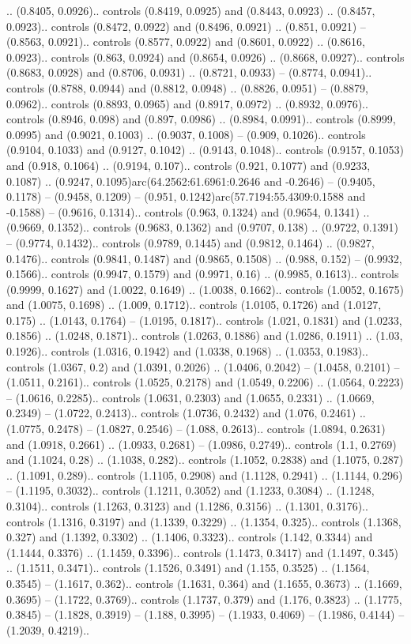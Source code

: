.. (0.8405, 0.0926).. controls (0.8419, 0.0925) and (0.8443, 0.0923) .. (0.8457, 0.0923).. controls (0.8472, 0.0922) and (0.8496, 0.0921) .. (0.851, 0.0921) -- (0.8563, 0.0921).. controls (0.8577, 0.0922) and (0.8601, 0.0922) .. (0.8616, 0.0923).. controls (0.863, 0.0924) and (0.8654, 0.0926) .. (0.8668, 0.0927).. controls (0.8683, 0.0928) and (0.8706, 0.0931) .. (0.8721, 0.0933) -- (0.8774, 0.0941).. controls (0.8788, 0.0944) and (0.8812, 0.0948) .. (0.8826, 0.0951) -- (0.8879, 0.0962).. controls (0.8893, 0.0965) and (0.8917, 0.0972) .. (0.8932, 0.0976).. controls (0.8946, 0.098) and (0.897, 0.0986) .. (0.8984, 0.0991).. controls (0.8999, 0.0995) and (0.9021, 0.1003) .. (0.9037, 0.1008) -- (0.909, 0.1026).. controls (0.9104, 0.1033) and (0.9127, 0.1042) .. (0.9143, 0.1048).. controls (0.9157, 0.1053) and (0.918, 0.1064) .. (0.9194, 0.107).. controls (0.921, 0.1077) and (0.9233, 0.1087) .. (0.9247, 0.1095)arc(64.2562:61.6961:0.2646 and -0.2646) -- (0.9405, 0.1178) -- (0.9458, 0.1209) -- (0.951, 0.1242)arc(57.7194:55.4309:0.1588 and -0.1588) -- (0.9616, 0.1314).. controls (0.963, 0.1324) and (0.9654, 0.1341) .. (0.9669, 0.1352).. controls (0.9683, 0.1362) and (0.9707, 0.138) .. (0.9722, 0.1391) -- (0.9774, 0.1432).. controls (0.9789, 0.1445) and (0.9812, 0.1464) .. (0.9827, 0.1476).. controls (0.9841, 0.1487) and (0.9865, 0.1508) .. (0.988, 0.152) -- (0.9932, 0.1566).. controls (0.9947, 0.1579) and (0.9971, 0.16) .. (0.9985, 0.1613).. controls (0.9999, 0.1627) and (1.0022, 0.1649) .. (1.0038, 0.1662).. controls (1.0052, 0.1675) and (1.0075, 0.1698) .. (1.009, 0.1712).. controls (1.0105, 0.1726) and (1.0127, 0.175) .. (1.0143, 0.1764) -- (1.0195, 0.1817).. controls (1.021, 0.1831) and (1.0233, 0.1856) .. (1.0248, 0.1871).. controls (1.0263, 0.1886) and (1.0286, 0.1911) .. (1.03, 0.1926).. controls (1.0316, 0.1942) and (1.0338, 0.1968) .. (1.0353, 0.1983).. controls (1.0367, 0.2) and (1.0391, 0.2026) .. (1.0406, 0.2042) -- (1.0458, 0.2101) -- (1.0511, 0.2161).. controls (1.0525, 0.2178) and (1.0549, 0.2206) .. (1.0564, 0.2223) -- (1.0616, 0.2285).. controls (1.0631, 0.2303) and (1.0655, 0.2331) .. (1.0669, 0.2349) -- (1.0722, 0.2413).. controls (1.0736, 0.2432) and (1.076, 0.2461) .. (1.0775, 0.2478) -- (1.0827, 0.2546) -- (1.088, 0.2613).. controls (1.0894, 0.2631) and (1.0918, 0.2661) .. (1.0933, 0.2681) -- (1.0986, 0.2749).. controls (1.1, 0.2769) and (1.1024, 0.28) .. (1.1038, 0.282).. controls (1.1052, 0.2838) and (1.1075, 0.287) .. (1.1091, 0.289).. controls (1.1105, 0.2908) and (1.1128, 0.2941) .. (1.1144, 0.296) -- (1.1195, 0.3032).. controls (1.1211, 0.3052) and (1.1233, 0.3084) .. (1.1248, 0.3104).. controls (1.1263, 0.3123) and (1.1286, 0.3156) .. (1.1301, 0.3176).. controls (1.1316, 0.3197) and (1.1339, 0.3229) .. (1.1354, 0.325).. controls (1.1368, 0.327) and (1.1392, 0.3302) .. (1.1406, 0.3323).. controls (1.142, 0.3344) and (1.1444, 0.3376) .. (1.1459, 0.3396).. controls (1.1473, 0.3417) and (1.1497, 0.345) .. (1.1511, 0.3471).. controls (1.1526, 0.3491) and (1.155, 0.3525) .. (1.1564, 0.3545) -- (1.1617, 0.362).. controls (1.1631, 0.364) and (1.1655, 0.3673) .. (1.1669, 0.3695) -- (1.1722, 0.3769).. controls (1.1737, 0.379) and (1.176, 0.3823) .. (1.1775, 0.3845) -- (1.1828, 0.3919) -- (1.188, 0.3995) -- (1.1933, 0.4069) -- (1.1986, 0.4144) -- (1.2039, 0.4219).. 